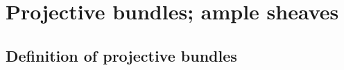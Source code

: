 \section{Projective bundles; ample sheaves}
\label{section:II.4}


\subsection{Definition of projective bundles}
\label{subsection:II.4.1}










